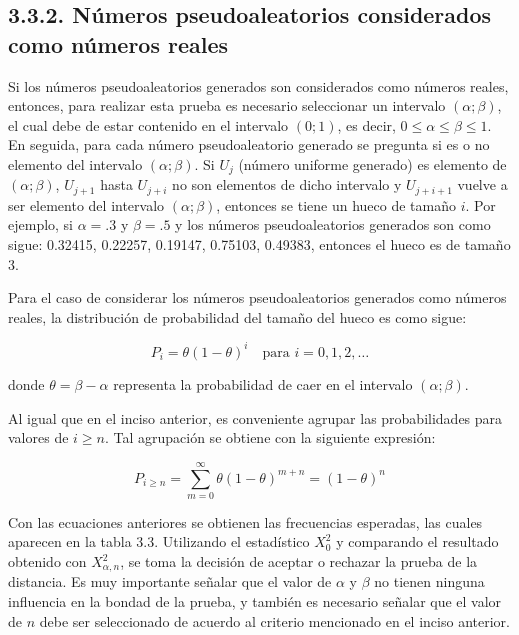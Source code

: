 \documentclass[11pt,letterpaper]{report}
\begin{document}
\subsection*{3.3.2. Números pseudoaleatorios considerados como números reales}

Si los números pseudoaleatorios generados son considerados como números
reales, entonces, para realizar esta prueba es necesario seleccionar un
intervalo $(\alpha;\beta)$, el cual debe de estar contenido en el
intervalo $(0;1)$, es decir, $0 \le \alpha \le \beta \le 1$. En seguida,
para cada número pseudoaleatorio generado se pregunta si es o no
elemento del intervalo $(\alpha;\beta)$. Si $U_j$ (número uniforme
generado) es elemento de $(\alpha;\beta)$, $U_{j+1}$ hasta $U_{j+i}$ no
son elementos de dicho intervalo y $U_{j+i+1}$ vuelve a ser elemento del
intervalo $(\alpha;\beta)$, entonces se tiene un hueco de tamaño $i$.
Por ejemplo, si $\alpha = .3$ y $\beta = .5$ y los números
pseudoaleatorios generados son como sigue: 0.32415, 0.22257, 0.19147,
0.75103, 0.49383, entonces el hueco es de tamaño 3.

Para el caso de considerar los números pseudoaleatorios generados como
números reales, la distribución de probabilidad del tamaño del hueco es
como sigue:

\begin{equation}
P_i = \theta(1-\theta)^i \quad \text{para } i = 0, 1, 2, \ldots
\end{equation}

donde $\theta = \beta - \alpha$ representa la probabilidad de caer en el
intervalo $(\alpha;\beta)$.

Al igual que en el inciso anterior, es conveniente agrupar las
probabilidades para valores de $i \ge n$. Tal agrupación se obtiene con
la siguiente expresión:

\begin{equation}
P_{i \ge n} = \sum_{m=0}^{\infty} \theta(1-\theta)^{m+n} = (1-\theta)^n
\end{equation}

Con las ecuaciones anteriores se obtienen las frecuencias esperadas, las
cuales aparecen en la tabla 3.3. Utilizando el estadístico $X_0^2$ y
comparando el resultado obtenido con $X^2_{\alpha,n}$, se toma la
decisión de aceptar o rechazar la prueba de la distancia. Es muy
importante señalar que el valor de $\alpha$ y $\beta$ no tienen ninguna
influencia en la bondad de la prueba, y también es necesario señalar que
el valor de $n$ debe ser seleccionado de acuerdo al criterio mencionado
en el inciso anterior.
\end{document}
